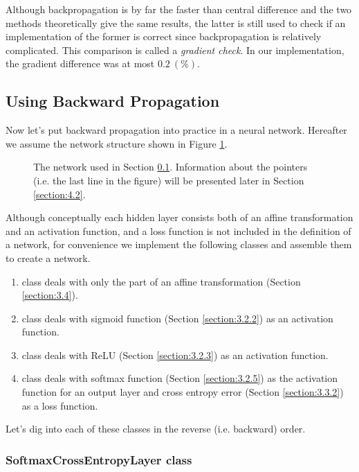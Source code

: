 \documentclass{article}
\theoremstyle{definition}
\newcommand{\sect}[1]{Section \ref{section:#1}}
\newcommand{\fig}[1]{Figure \ref{fig:#1}}
\begin{document}
Although backpropagation is by far the faster than central difference and the two methods theoretically give the same results, the latter is still used to check if an implementation of the former is correct since backpropagation is relatively complicated. This comparison is called a {\it gradient check}. In our implementation, the gradient difference was at most $0.2\ (\%)$.

\subsection{Using Backward Propagation} \label{section:3.7}

Now let's put backward propagation into practice in a neural network. Hereafter we assume the network structure shown in \fig{3.6}.

\begin{figure}[H]
    \centering
    \begin{subfigure}[H]{1.0\textwidth}
	\end{subfigure}
    \caption{The network used in \sect{3.7}. Information about the pointers (i.e. the last line in the figure) will be presented later in \sect{4.2}.}
    \label{fig:3.6}
\end{figure}

Although conceptually each hidden layer consists both of an affine transformation and an activation function, and a loss function is not included in the definition of a network, for convenience we implement the following classes and assemble them to create a network.
\begin{enumerate}
\item
{} class deals with only the part of an affine transformation (\sect{3.4}).
\item
{} class deals with sigmoid function (\sect{3.2.2}) as an activation function.
\item
{} class deals with ReLU (\sect{3.2.3}) as an activation function.
\item
{} class deals with softmax function (\sect{3.2.5}) as the activation function for an output layer and cross entropy error (\sect{3.3.2}) as a loss function.
\end{enumerate}

Let's dig into each of these classes in the reverse (i.e. backward) order.

\subsubsection{SoftmaxCrossEntropyLayer class}
\end{document}
